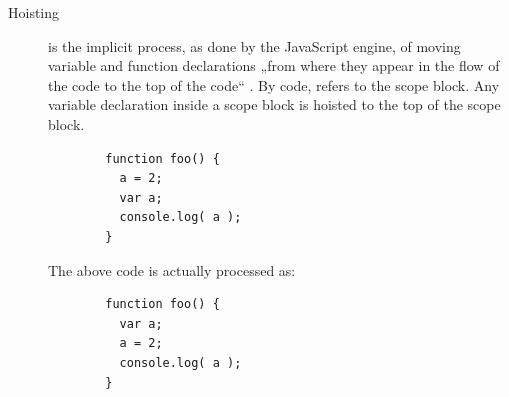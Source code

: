 \begin{description}
\item[Hoisting]
is the implicit process, as done by the JavaScript engine, of moving
variable and function declarations „from where they appear in the flow
of the code to the top of the code“ \cite{getify}. By code,
 refers to the scope block. Any variable declaration
inside a scope block is hoisted to the top of the scope block.

\begin{verbatim}
        function foo() {
          a = 2;
          var a;
          console.log( a );
        }
\end{verbatim}

The above code is actually processed as:

\begin{verbatim}
        function foo() {
          var a;
          a = 2;
          console.log( a );
        }
\end{verbatim}


\end{description}
